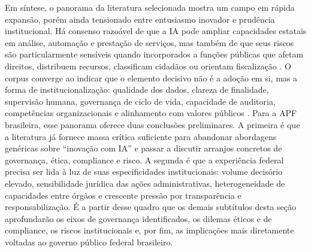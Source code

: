 \documentclass[12pt,a4paper]{article}
\begin{document}
Em síntese, o panorama da literatura selecionada mostra um campo em rápida expansão, porém ainda tensionado entre entusiasmo inovador e prudência institucional. Há consenso razoável de que a IA pode ampliar capacidades estatais em análise, automação e prestação de serviços, mas também de que seus riscos são particularmente sensíveis quando incorporados a funções públicas que afetam direitos, distribuem recursos, classificam cidadãos ou orientam fiscalização \autocite{pi2021machine} \autocite{parycek2023artificial} \autocite{batool2025ai}. O corpus converge ao indicar que o elemento decisivo não é a adoção em si, mas a forma de institucionalização: qualidade dos dados, clareza de finalidade, supervisão humana, governança de ciclo de vida, capacidade de auditoria, competências organizacionais e alinhamento com valores públicos \autocite{criado2024artificial} \autocite{sigfrids2022how} \autocite{mkander2023auditing}. Para a APF brasileira, esse panorama oferece duas conclusões preliminares. A primeira é que a literatura já fornece massa crítica suficiente para abandonar abordagens genéricas sobre “inovação com IA” e passar a discutir arranjos concretos de governança, ética, compliance e risco. A segunda é que a experiência federal precisa ser lida à luz de suas especificidades institucionais: volume decisório elevado, sensibilidade jurídica das ações administrativas, heterogeneidade de capacidades entre órgãos e crescente pressão por transparência e responsabilização. É a partir desse quadro que os demais subtítulos desta seção aprofundarão os eixos de governança identificados, os dilemas éticos e de compliance, os riscos institucionais e, por fim, as implicações mais diretamente voltadas ao governo público federal brasileiro.
\end{document}
